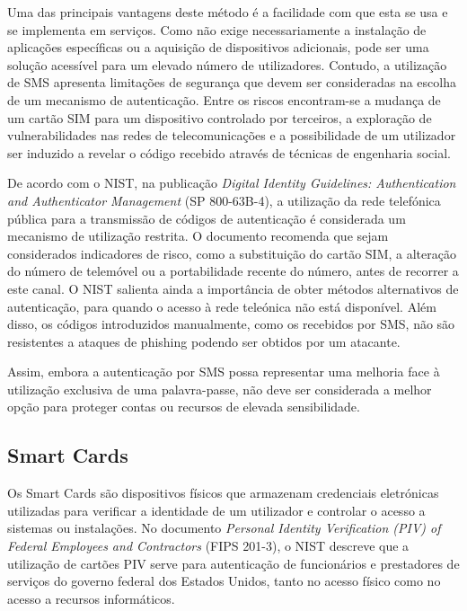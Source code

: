 \hspace{1cm} Uma das principais vantagens deste método é a facilidade com que esta se usa e se implementa em serviços. Como não exige necessariamente a instalação de aplicações específicas ou a aquisição de dispositivos adicionais, pode ser uma solução acessível para um elevado número de utilizadores. Contudo, a utilização de SMS apresenta limitações de segurança que devem ser consideradas na escolha de um mecanismo de autenticação. Entre os riscos encontram-se a mudança de um cartão SIM para um dispositivo controlado por terceiros, a exploração de vulnerabilidades nas redes de telecomunicações e a possibilidade de um utilizador ser induzido a revelar o código recebido através de técnicas de engenharia social.

\hspace{1cm} De acordo com o NIST, na publicação \textit{Digital Identity Guidelines: Authentication and Authenticator Management} (SP 800-63B-4), a utilização da rede telefónica pública para a transmissão de códigos de autenticação é considerada um mecanismo de utilização restrita. O documento recomenda que sejam considerados indicadores de risco, como a substituição do cartão SIM, a alteração do número de telemóvel ou a portabilidade recente do número, antes de recorrer a este canal. O NIST salienta ainda a importância de obter métodos alternativos de autenticação, para quando o acesso à rede teleónica não está disponível. Além disso, os códigos introduzidos manualmente, como os recebidos por SMS, não são resistentes a ataques de phishing podendo ser obtidos por um atacante.

\hspace{1cm} Assim, embora a autenticação por SMS possa representar uma melhoria face à utilização exclusiva de uma palavra-passe, não deve ser considerada a melhor opção para proteger contas ou recursos de elevada sensibilidade.

\subsection{Smart Cards}

\hspace{1cm} Os Smart Cards são dispositivos físicos que armazenam credenciais eletrónicas utilizadas para verificar a identidade de um utilizador e controlar o acesso a sistemas ou instalações. No documento \textit{Personal Identity Verification (PIV) of Federal Employees and Contractors} (FIPS 201-3), o NIST descreve que a utilização de cartões PIV serve para autenticação de funcionários e prestadores de serviços do governo federal dos Estados Unidos, tanto no acesso físico como no acesso a recursos informáticos.

